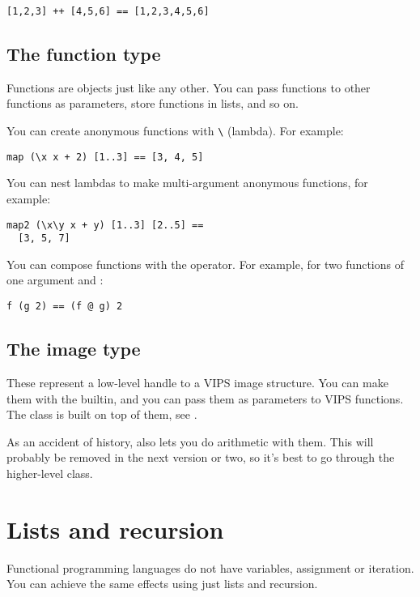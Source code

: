 \begin{verbatim}
[1,2,3] ++ [4,5,6] == [1,2,3,4,5,6]
\end{verbatim}

\subsection{The function type}

Functions are objects just like any other. You can pass functions to other
functions as parameters, store functions in lists, and so on. 

You can create anonymous functions with \verb"\" (lambda). For example:

\begin{verbatim}
map (\x x + 2) [1..3] == [3, 4, 5]
\end{verbatim}

You can nest lambdas to make multi-argument anonymous functions, for example:

\begin{verbatim}
map2 (\x\y x + y) [1..3] [2..5] == 
  [3, 5, 7]
\end{verbatim}

You can compose functions with the  operator. For example, for two
functions of one argument  and :

\begin{verbatim}
f (g 2) == (f @ g) 2
\end{verbatim}

\subsection{The image type}

These represent a low-level handle to a VIPS image structure. You can make
them with the  builtin, and you can pass them as parameters to
VIPS functions. The  class is built on top of them,
see .

As an accident of history, \nip{} also lets you do arithmetic with them. This
will probably be removed in the next version or two, so it's best to go
through the higher-level  class.

\section{Lists and recursion}

Functional programming languages do not have variables, assignment or
iteration. You can achieve the same effects using just lists and recursion.


